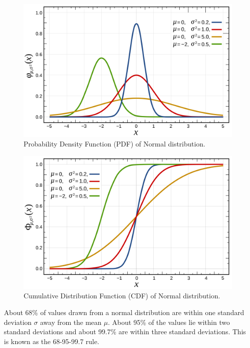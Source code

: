 \begin{figure}[h!]
\begin{center}
	\includegraphics[scale=0.08]{normal_pdf.png}
	\caption[]{Probability Density Function (PDF) of Normal distribution.}
	\label{fairdiepmf}
	\end{center}
	\end{figure}
	
\begin{figure}[h!]
\begin{center}
	\includegraphics[scale=0.08]{normal_cdf.png}
	\caption[]{Cumulative Distribution Function (CDF) of Normal distribution.}
	\label{fairdiepmf}
	\end{center}
	\end{figure}
	
About 68\% of values drawn from a normal distribution are within one standard deviation $\sigma$ away from the mean $\mu$. About 95\% of the values lie within two standard deviations and about 99.7\% are within three standard deviations. This is known as the 68-95-99.7 rule. 

